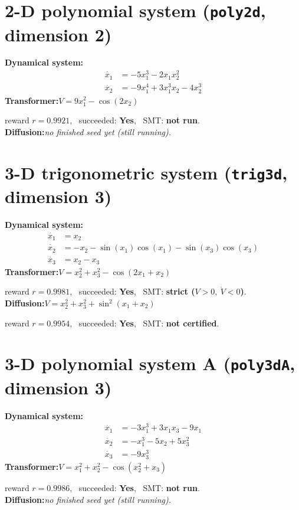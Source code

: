 \documentclass[11pt]{article}
\begin{document}
\section*{2-D polynomial system \quad (\texttt{poly2d}, dimension 2)}
\textbf{Dynamical system:}
\begin{align*}
\dot{x_{1}} &= - 5 x_{1}^{3} - 2 x_{1} x_{2}^{2} \\
\dot{x_{2}} &= - 9 x_{1}^{4} + 3 x_{1}^{3} x_{2} - 4 x_{2}^{3} 
\end{align*}
\textbf{Transformer:}\quad $V = 9 x_{1}^{2} - \cos{\left(2 x_{2} \right)}$
\par\noindent\hspace{1em}reward $r=0.9921$, \ succeeded: \textbf{Yes}, \ SMT: \textbf{not run}.\\[0.5ex]
\textbf{Diffusion:}\quad \emph{no finished seed yet (still running).}\\[1ex]
\section*{3-D trigonometric system \quad (\texttt{trig3d}, dimension 3)}
\textbf{Dynamical system:}
\begin{align*}
\dot{x_{1}} &= x_{2} \\
\dot{x_{2}} &= - x_{2} - \sin{\left(x_{1} \right)} \cos{\left(x_{1} \right)} - \sin{\left(x_{3} \right)} \cos{\left(x_{3} \right)} \\
\dot{x_{3}} &= x_{2} - x_{3} 
\end{align*}
\textbf{Transformer:}\quad $V = x_{2}^{2} + x_{3}^{2} - \cos{\left(2 x_{1} + x_{2} \right)}$
\par\noindent\hspace{1em}reward $r=0.9981$, \ succeeded: \textbf{Yes}, \ SMT: \textbf{strict ($V>0,\ \dot V<0$)}.\\[0.5ex]
\textbf{Diffusion:}\quad $V = x_{2}^{2} + x_{3}^{2} + \sin^{2}{\left(x_{1} + x_{2} \right)}$
\par\noindent\hspace{1em}reward $r=0.9954$, \ succeeded: \textbf{Yes}, \ SMT: \textbf{not certified}.\\[1ex]
\section*{3-D polynomial system A \quad (\texttt{poly3dA}, dimension 3)}
\textbf{Dynamical system:}
\begin{align*}
\dot{x_{1}} &= - 3 x_{1}^{3} + 3 x_{1} x_{3} - 9 x_{1} \\
\dot{x_{2}} &= - x_{1}^{3} - 5 x_{2} + 5 x_{3}^{2} \\
\dot{x_{3}} &= - 9 x_{3}^{3} 
\end{align*}
\textbf{Transformer:}\quad $V = x_{1}^{2} + x_{2}^{2} - \cos{\left(x_{2}^{2} + x_{3} \right)}$
\par\noindent\hspace{1em}reward $r=0.9986$, \ succeeded: \textbf{Yes}, \ SMT: \textbf{not run}.\\[0.5ex]
\textbf{Diffusion:}\quad \emph{no finished seed yet (still running).}\\[1ex]
\end{document}

